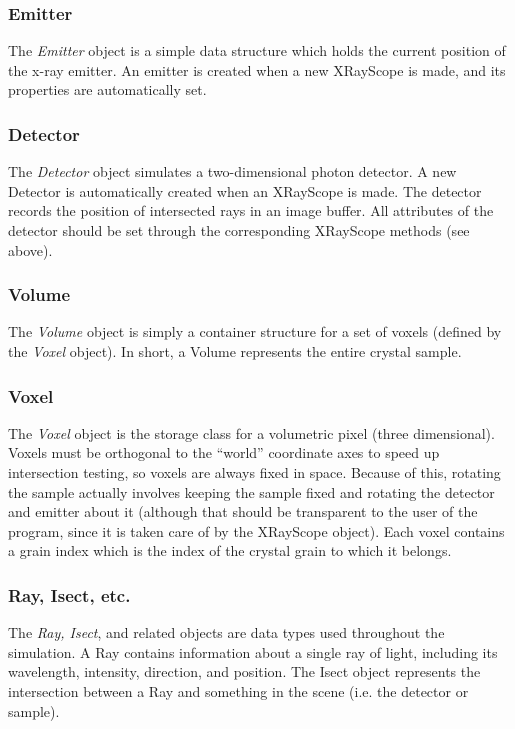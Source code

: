 \documentclass{article}
\begin{document}
\subsubsection{Emitter}
The {\em Emitter} object is a simple data structure which holds the
current position of the x-ray emitter.  An emitter is created when a
new XRayScope is made, and its properties are automatically set. 


\subsubsection{Detector}
The {\em Detector} object simulates a two-dimensional photon
detector. A new Detector is automatically created when an XRayScope is made.  
The detector records the position of intersected rays in an image
buffer.  All attributes of the detector should be set through the
corresponding XRayScope methods (see above). 

\subsubsection{Volume}
The {\em Volume} object is simply a container structure for a set of
voxels (defined by the {\em Voxel} object).  In short, a Volume
represents the entire crystal sample.  

\subsubsection{Voxel}
The {\em Voxel} object is the storage class for a volumetric pixel
(three dimensional).  Voxels must be orthogonal to the ``world''
coordinate axes to speed up intersection testing, so voxels are always
fixed in space.  Because of this, rotating the sample actually
involves keeping the sample fixed and rotating the detector and
emitter about it (although that should be transparent to the user of
the program, since it is taken care of by the XRayScope object).  Each
voxel contains a grain index which is the index of the crystal grain
to which it belongs.

\subsubsection{Ray, Isect, etc.}
The {\em Ray, Isect}, and related objects are data types used
throughout the simulation.  A Ray contains information about a single
ray of light, including its wavelength, intensity, direction, and
position. The Isect object represents the intersection between a Ray
and something in the scene (i.e. the detector or sample). 
\end{document}
